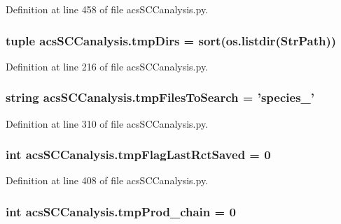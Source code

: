 Definition at line 458 of file acs\-S\-C\-Canalysis.\-py.

\hypertarget{a00097_ace4c571efd2e5ecd266ce5701f761a83}{
\subsubsection[{tmp\-Dirs}]{\setlength{\rightskip}{0pt plus 5cm}tuple acs\-S\-C\-Canalysis.\-tmp\-Dirs = sort(os.\-listdir({\bf Str\-Path}))}}\label{a00097_ace4c571efd2e5ecd266ce5701f761a83}


Definition at line 216 of file acs\-S\-C\-Canalysis.\-py.

\hypertarget{a00097_a141356fc914110fdf3ec4f0fc3beaab5}{
\subsubsection[{tmp\-Files\-To\-Search}]{\setlength{\rightskip}{0pt plus 5cm}string acs\-S\-C\-Canalysis.\-tmp\-Files\-To\-Search = 'species\-\_\-'}}\label{a00097_a141356fc914110fdf3ec4f0fc3beaab5}


Definition at line 310 of file acs\-S\-C\-Canalysis.\-py.

\hypertarget{a00097_a6e8aff976901d1424dd1ff00c3387014}{
\subsubsection[{tmp\-Flag\-Last\-Rct\-Saved}]{\setlength{\rightskip}{0pt plus 5cm}int acs\-S\-C\-Canalysis.\-tmp\-Flag\-Last\-Rct\-Saved = 0}}\label{a00097_a6e8aff976901d1424dd1ff00c3387014}


Definition at line 408 of file acs\-S\-C\-Canalysis.\-py.

\hypertarget{a00097_aee6b4f50387d471b70458cf703c0863b}{
\subsubsection[{tmp\-Prod\-\_\-chain}]{\setlength{\rightskip}{0pt plus 5cm}int acs\-S\-C\-Canalysis.\-tmp\-Prod\-\_\-chain = 0}}\label{a00097_aee6b4f50387d471b70458cf703c0863b}


